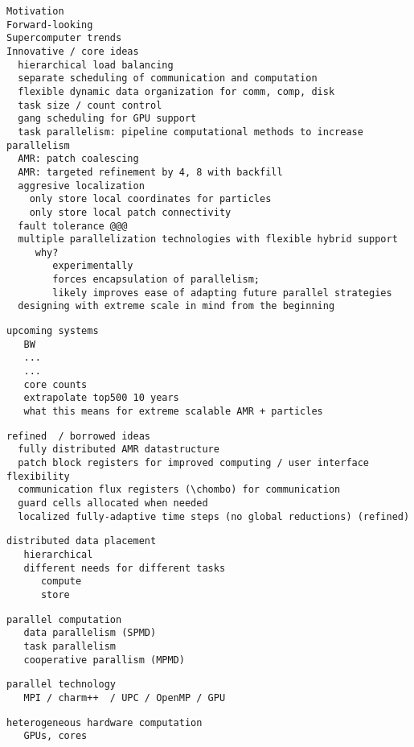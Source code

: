 \documentclass[10pt]{article}
\begin{document}
\begin{verbatim}
Motivation
Forward-looking
Supercomputer trends
Innovative / core ideas
  hierarchical load balancing
  separate scheduling of communication and computation
  flexible dynamic data organization for comm, comp, disk
  task size / count control
  gang scheduling for GPU support
  task parallelism: pipeline computational methods to increase parallelism
  AMR: patch coalescing
  AMR: targeted refinement by 4, 8 with backfill
  aggresive localization
    only store local coordinates for particles
    only store local patch connectivity
  fault tolerance @@@
  multiple parallelization technologies with flexible hybrid support
     why?  
        experimentally 
        forces encapsulation of parallelism; 
        likely improves ease of adapting future parallel strategies
  designing with extreme scale in mind from the beginning
\end{verbatim}

\begin{verbatim}
upcoming systems
   BW
   ...
   ...
   core counts
   extrapolate top500 10 years
   what this means for extreme scalable AMR + particles
\end{verbatim}

\begin{verbatim}
refined  / borrowed ideas
  fully distributed AMR datastructure
  patch block registers for improved computing / user interface flexibility
  communication flux registers (\chombo) for communication
  guard cells allocated when needed
  localized fully-adaptive time steps (no global reductions) (refined)
\end{verbatim}



\begin{verbatim}
distributed data placement
   hierarchical
   different needs for different tasks
      compute
      store
\end{verbatim}

\begin{verbatim}
parallel computation
   data parallelism (SPMD)
   task parallelism
   cooperative parallism (MPMD)
\end{verbatim}

\begin{verbatim}
parallel technology
   MPI / charm++  / UPC / OpenMP / GPU
\end{verbatim}

\begin{verbatim}
heterogeneous hardware computation
   GPUs, cores
\end{verbatim}
\end{document}
